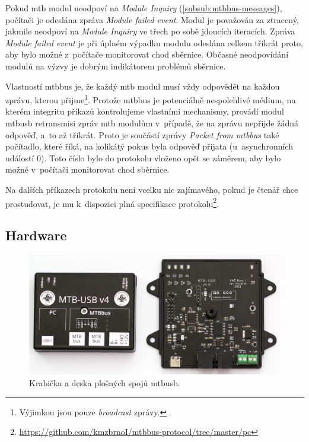 Pokud \gls{mtb} modul neodpoví na \textit{Module Inquiry}
(\ref{subsub:mtbbus-messages}), počítači je odeslána zpráva \textit{Module
failed event}. Modul je považován za ztracený, jakmile neodpoví na
\textit{Module Inquiry} ve třech po sobě jdoucích iteracích. Zpráva
\textit{Module failed event} je při úplném výpadku modulu odeslána
celkem třikrát proto, aby bylo možné z~počítače monitorovat chod sběrnice.
Občasné neodpovídání modulů na výzvy je dobrým indikátorem problémů sběrnice.

Vlastností \gls{mtbbus} je, že každý \gls{mtb} modul musí vždy
odpovědět na každou zprávu, kterou přijme\footnote{Výjimkou jsou pouze
\textit{broadcast} zprávy.}. Protože \gls{mtbbus} je potenciálně nespolehlivé
médium, na kterém integritu příkazů kontrolujeme vlastními mechanismy, provádí
modul \gls{mtbusb} retransmisi zpráv \gls{mtb} modulům v~případě, že na zprávu
nepřijde žádná odpověď, a~to až třikrát. Proto je součástí zprávy \textit{Packet
from \gls{mtbbus}} také počítadlo, které říká, na kolikátý pokus byla
odpověď přijata (u~asynchronních událostí $0$). Toto číslo bylo do protokolu
vloženo opět se záměrem, aby bylo možné v~počítači monitorovat chod sběrnice.

Na dalších příkazech protokolu není vcelku nic zajímavého, pokud je čtenář chce
prostudovat, je mu k~dispozici plná specifikace protokolu\footnote{
\url{https://github.com/kmzbrnoI/mtbbus-protocol/tree/master/pc}}.

\subsection{Hardware} \label{subsec:mtbusb:hardware}

\begin{figure}[ht]
\includegraphics[width=\textwidth]{data/usb-inside.jpg}
\caption{Krabička a deska plošných spojů \gls{mtbusb}.}
\label{fig:mtbusb-inside}
\end{figure}

